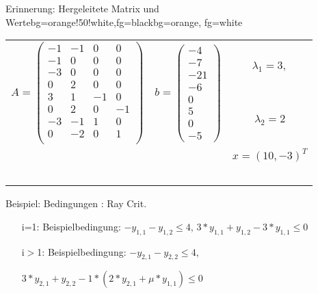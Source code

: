 \begin{frame}
	\begin{variableblock}{Erinnerung: Hergeleitete Matrix und Werte}{bg=orange!50!white,fg=black}{bg=orange, fg=white}
		\begin{tabular}{llc}
			\multirow{2}{*}{$A=\begin{pmatrix}
				-1 		& -1 		&  0		& 0		 \\
				-1 		& 0 		&  0		& 0		 \\
				-3 		& 0 		&  0		& 0		 \\
				0 		& 2 		&  0		& 0		 \\
				3 		& 1 		&  -1		& 0		 \\
				0 		& 2 		&  0		& -1	 \\
				-3 		& -1 		&  1		& 0		 \\
				0 		& -2 		&  0		& 1	 	 \\
				\end{pmatrix}$}&\multirow{2}{*}{$ b=\begin{pmatrix}
				-4 \\ -7 \\ -21 \\ -6 \\ 0 \\ 5 \\ 0 \\ -5
				\end{pmatrix} $}& $\lambda_1 = 3,$ \\
			& &  $\lambda_2 = 2$\\
			& & $x=(10, -3)^T$ \\
			& & \\
			& & \\
			& & \\
			& & \\
			& & \\
		\end{tabular}
	\end{variableblock}
	\begin{exampleblock}{Beispiel: Bedingungen : Ray Crit.}
		\begin{itemize}
			\setlength{\itemindent}{0.25cm}
			\item[i=1:] Beispielbedingung: $-y_{1,1}-y_{1,2}\le 4$, $3*y_{1,1}+y_{1,2}-3*y_{1,1}\le0$
			\item[i$>$1:] Beispielbedingung: $-y_{2,1}-y_{2,2}\le 4$, 
			\item[] $3*y_{2,1}+y_{2,2}-1*(2*y_{2,1}+\mu*y_{1,1})\le0$
		\end{itemize}
	\end{exampleblock}
\end{frame}




